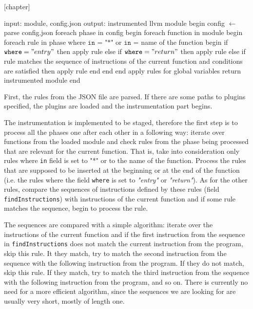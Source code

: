 [chapter] %

\begin{algorithm}[caption={Applying the instrumentation rules.}, label={alg1},columns=fullflexible]
 input: module, config.json
 output: instrumented llvm module
 begin
   config $\gets$ parse config.json
   foreach phase in config
   begin
      foreach function in module
      begin
         foreach rule in phase where $\texttt{in = "*"}$ or $\texttt{in =}$ name of the function
         begin
            if $\texttt{where} = "entry"$ then apply rule
            else if $\texttt{where} = "return"$ then apply rule
            else if rule matches the sequence of instructions of the current
                    function and conditions are satisfied then apply rule
         end
      end
   end
   apply rules for global variables
   return instrumented module
 end
\end{algorithm}

First, the rules from the JSON file are parsed. If there are some paths to
plugins specified, the plugins are loaded and the instrumentation part begins.

The instrumentation is implemented to be staged, therefore the first step is to
process all the phases one after each other in a following way: iterate over
functions from the loaded module and check rules from the phase being processed
that are relevant for the current function. That is, take into consideration
only rules where \texttt{in} field is set to "*" or to the name of the
function. Process the rules that are supposed to be inserted at the beginning
or at the end of the function (i.e. the rules where the field \texttt{where} is
set to \emph{"entry"} or \emph{"return"}). As for the other rules, compare the
sequences of instructions defined by these rules (field
\texttt{findInstructions}) with instructions of the current function and if
some rule matches the sequence, begin to process the rule.

The sequences are compared with a simple algorithm: iterate over the
instructions of the current function and if the first instruction from the
sequence in \texttt{findInstructions} does not match the current instruction
from the program, skip this rule. It they match, try to match the second
instruction from the sequence with the following instruction from the program.
If they do not match, skip this rule. If they match, try to match the third
instruction from the sequence with the following instruction from the program,
and so on. There is currently no need for a more efficient algorithm, since the
sequences we are looking for are usually very short, mostly of length one.

